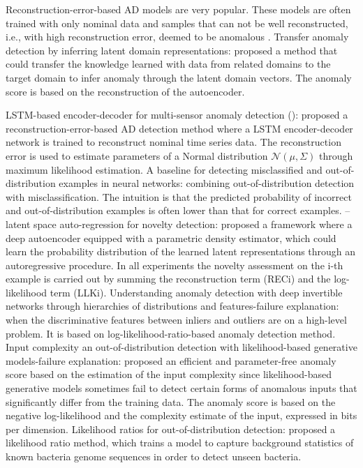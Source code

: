 \documentclass{article}
\begin{document}
	Reconstruction-error-based AD models are very popular. These models are often trained with only nominal data and samples that can not be well reconstructed, i.e., with high reconstruction error, deemed to be anomalous \cite{kumagai2019transfer}.
	\cite{kumagai2019transfer} Transfer anomaly detection by inferring latent domain representations: proposed a method that could transfer the knowledge learned with data from related domains to the target domain to infer anomaly through the latent domain vectors. The anomaly score is based on the reconstruction of the autoencoder.
	
	\cite{malhotra2016lstm} LSTM-based encoder-decoder for multi-sensor anomaly detection (): proposed a reconstruction-error-based AD detection method where a LSTM encoder-decoder network is trained to reconstruct nominal time series data. The reconstruction error is used to estimate parameters of a Normal distribution $\mathcal{N}(\mu, \Sigma)$ through maximum likelihood estimation.
	\cite{hendrycks2016baseline} A baseline for detecting misclassified and out-of-distribution examples in neural networks: combining out-of-distribution detection with misclassification. The intuition is that the predicted probability of incorrect and out-of-distribution examples is often lower than that for correct examples.
	\cite{abati2019latent}--latent space auto-regression for novelty detection: proposed a framework where a deep autoencoder equipped with a parametric density estimator, which could learn the probability distribution of the learned latent representations through an autoregressive procedure. In all experiments the novelty assessment on the i-th example is carried out by summing the reconstruction term (RECi) and the log-likelihood term (LLKi).
	\cite{schirrmeister2020understanding} Understanding anomaly detection with deep invertible networks through hierarchies of distributions and features-failure explanation: when the discriminative features between inliers and outliers are on a high-level problem. It is based on log-likelihood-ratio-based anomaly detection method.
	\cite{serra2019input} Input complexity an out-of-distribution detection with likelihood-based generative models-failure explanation: proposed an efficient and parameter-free anomaly score based on the estimation of the input complexity since likelihood-based generative models sometimes fail to detect certain forms of anomalous inputs that significantly differ from the training data. The anomaly score is based on the negative log-likelihood and the complexity estimate of the input, expressed in bits per dimension.
	\cite{ren2019likelihood} %
	Likelihood ratios for out-of-distribution detection: proposed a likelihood ratio method, which trains a model to capture background statistics of known bacteria genome sequences in order to detect unseen bacteria. 
	
\end{document}
